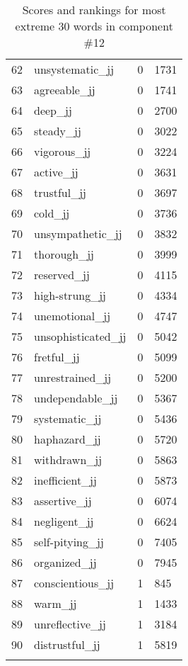 \begin{longtable}[!htbp]{| rlr@{.}l |}
    62 & unsystematic\_jj & 0 & 1731 \\
    63 & agreeable\_jj & 0 & 1741 \\
    64 & deep\_jj & 0 & 2700 \\
    65 & steady\_jj & 0 & 3022 \\
    66 & vigorous\_jj & 0 & 3224 \\
    67 & active\_jj & 0 & 3631 \\
    68 & trustful\_jj & 0 & 3697 \\
    69 & cold\_jj & 0 & 3736 \\
    70 & unsympathetic\_jj & 0 & 3832 \\
    71 & thorough\_jj & 0 & 3999 \\
    72 & reserved\_jj & 0 & 4115 \\
    73 & high-strung\_jj & 0 & 4334 \\
    74 & unemotional\_jj & 0 & 4747 \\
    75 & unsophisticated\_jj & 0 & 5042 \\
    76 & fretful\_jj & 0 & 5099 \\
    77 & unrestrained\_jj & 0 & 5200 \\
    78 & undependable\_jj & 0 & 5367 \\
    79 & systematic\_jj & 0 & 5436 \\
    80 & haphazard\_jj & 0 & 5720 \\
    81 & withdrawn\_jj & 0 & 5863 \\
    82 & inefficient\_jj & 0 & 5873 \\
    83 & assertive\_jj & 0 & 6074 \\
    84 & negligent\_jj & 0 & 6624 \\
    85 & self-pitying\_jj & 0 & 7405 \\
    86 & organized\_jj & 0 & 7945 \\
    87 & conscientious\_jj & 1 & 845 \\
    88 & warm\_jj & 1 & 1433 \\
    89 & unreflective\_jj & 1 & 3184 \\
    90 & distrustful\_jj & 1 & 5819 \\
    \hline
    \caption{Scores and rankings for most extreme 30 words in component \#12} \\
\end{longtable}
